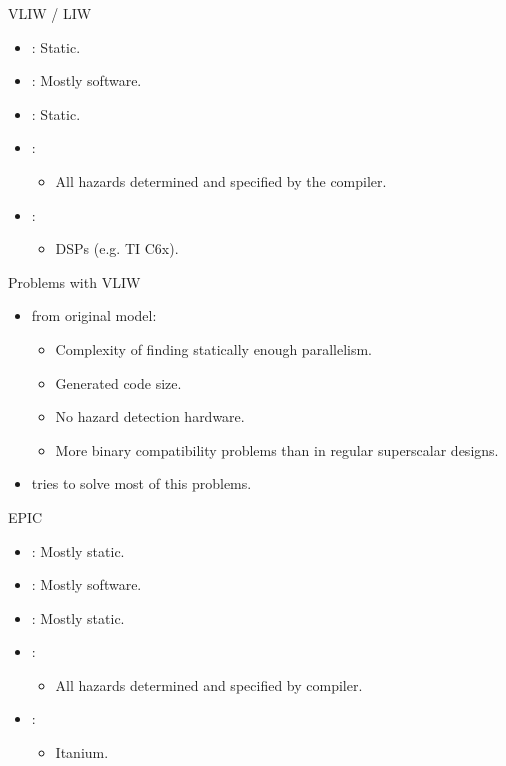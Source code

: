 \begin{frame}[t]{VLIW / LIW}
\begin{itemize}
  \item {}: Static.
  \item {}: Mostly software.
  \item {}: Static.
  \item {}:
    \begin{itemize}
      \item All hazards determined and specified by the compiler.
    \end{itemize}
  
  \item {}: 
    \begin{itemize}
      \item DSPs (e.g. TI C6x).
    \end{itemize}
\end{itemize}
\end{frame}

\begin{frame}[t]{Problems with VLIW}
\begin{itemize}
  \item {} from original  model:
    \begin{itemize}
      \item Complexity of finding statically enough parallelism.
      \item Generated code size.
      \item No hazard detection hardware.
      \item More binary compatibility problems than in regular superscalar designs.
    \end{itemize}

  \item {} tries to solve most of this problems.
\end{itemize}
\end{frame}

\begin{frame}[t]{EPIC}
\begin{itemize}
  \item {}: Mostly static.
  \item {}: Mostly software.
  \item {}: Mostly static.
  \item {}:
    \begin{itemize}
      \item All hazards determined and specified by compiler.
    \end{itemize}
  
  \item {}: 
    \begin{itemize}
      \item Itanium.
    \end{itemize}
\end{itemize}
\end{frame}


